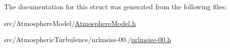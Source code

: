 The documentation for this struct was generated from the following files\+:\begin{DoxyCompactItemize}
\item 
src/\+Atmosphere\+Model/\hyperlink{AtmosphereModel_8h}{Atmosphere\+Model.\+h}\item 
src/\+Atmospheric\+Turbulence/nrlmsise-\/00./\hyperlink{nrlmsise-00_8h}{nrlmsise-\/00.\+h}\end{DoxyCompactItemize}

